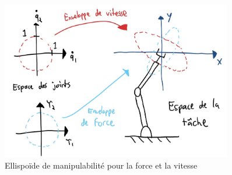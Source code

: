 \begin{figure}[htbp]
	\centering
		\includegraphics[width=0.90\textwidth]{fig/forcemanipulabilityellipsoid.jpg}
	\caption{Ellispoïde de manipulabilité pour la force et la vitesse}
	\label{fig:forcemanipulabilityellipsoid}
\end{figure}



